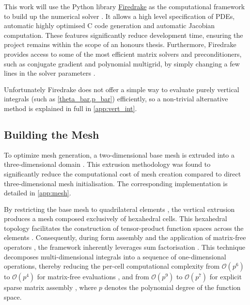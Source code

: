 \documentclass{article}
\begin{document}
This work will use the Python library \href{https://www.firedrakeproject.org/}{Firedrake} as the computational framework to build up the numerical solver \cite{FiredrakeFirstPaper}.
It allows a high level specification of PDEs, automatic highly optimised C code generation and automatic Jacobian computation.
These features significantly reduce development time, ensuring the project remains within the scope of an honours thesis.
Furthermore, Firedrake provides access to some of the most efficient matrix solvers and preconditioners, such as conjugate gradient and polynomial multigrid, by simply changing a few lines in the solver parameters \cite{FiredrakeUserManual, PETScUserManual, petsc-efficient, Dalcin2011}.

Unfortunately Firedrake does not offer a simple way to evaluate purely vertical integrals (such as \cref{theta_bar,p_bar}) efficiently, so a non-trivial alternative method is explained in full in \cref{app:vert_int}.

\subsection{Building the Mesh}\label{sec:mesh}

To optimize mesh generation, a two-dimensional base mesh is extruded into a three-dimensional domain \cite{McRae2016, Bercea2016}.
This extrusion methodology was found to significantly reduce the computational cost of mesh creation compared to direct three-dimensional mesh initialisation.
The corresponding implementation is detailed in \cref{app:mesh}.

By restricting the base mesh to quadrilateral elements \cite{HomolyaHam2016}, the vertical extrusion produces a mesh composed exclusively of hexahedral cells.
This hexahedral topology facilitates the construction of tensor-product function spaces across the elements \cite{McRae2016}.
Consequently, during form assembly and the application of matrix-free operators \cite{KirbyMitchell2018}, the framework inherently leverages sum factorisation \cite{FiredrakeUserManual, Homolya2017}.
This technique decomposes multi-dimensional integrals into a sequence of one-dimensional operations, thereby reducing the per-cell computational complexity from $\mathcal{O}(p^6)$ to $\mathcal{O}(p^4)$ for matrix-free evaluations \cite{Homolya2017, KirbyMitchell2018}, and from $\mathcal{O}(p^9)$ to $\mathcal{O}(p^7)$ for explicit sparse matrix assembly \cite{Homolya2017}, where $p$ denotes the polynomial degree of the function space.
\end{document}
